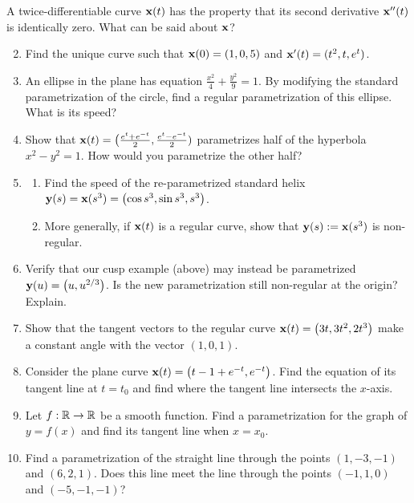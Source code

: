 \begin{exercises}
	\exstart A twice-differentiable curve ${\mathbf{x}}(t)$ has the property that its second derivative ${\mathbf{x}}''(t)$ is identically zero. What can be said about ${\mathbf{x}}$?
	\begin{enumerate}\setcounter{enumi}{1}  
		\item Find the unique curve such that ${\mathbf{x}}(0)=(1,0,5)$ and ${\mathbf{x}}'(t)=(t^2,t,e^t)$.
		
		\item An ellipse in the plane has equation $\frac{x^2}4+\frac{y^2}9=1$. By modifying the standard parametrization of the circle, find a regular parametrization of this ellipse. What is its speed?
		
		\item Show that ${\mathbf{x}}(t)=\bigl(\frac{e^t+e^{-t}}2,\frac{e^{t}-e^{-t}}2)$ parametrizes half of the hyperbola $x^2-y^2=1$. How would you parametrize the other half?
		
	  \item\label{exs:regnonintrinsic}\begin{enumerate}
	    \item Find the speed of the re-parametrized standard helix ${\mathbf{y}}(s)={\mathbf{x}}(s^3)=\bigl(\cos s^3,\sin s^3,s^3\bigr)$.
	    \item More generally, if ${\mathbf{x}}(t)$ is a regular curve, show that ${\mathbf{y}}(s):={\mathbf{x}}(s^3)$ is non-regular. 
	  \end{enumerate}
	  
		\item Verify that our cusp example (above) may instead be parametrized ${\mathbf{y}}(u)=\bigl(u,u^{2/3}\bigr)$. Is the new parametrization still non-regular at the origin? Explain.
		
		\item Show that the tangent vectors to the regular curve ${\mathbf{x}}(t)=\bigl(3t,3t^2,2t^3\bigr)$ make a constant angle with the vector $(1,0,1)$.
		
		\item Consider the plane curve ${\mathbf{x}}(t)=\bigl(t-1+e^{-t}, e^{-t}\bigr)$. Find the equation of its tangent line at $t=t_0$ and find where the tangent line intersects the $x$-axis.
	
		\item\label{exs:graphparam} Let $f:\mathbb{R}\to\mathbb{R}$ be a smooth function. Find a parametrization for the graph of $y=f(x)$ and find its tangent line when $x=x_0$.
	
		\item Find a parametrization of the straight line through the points $(1,-3,-1)$ and $(6,2,1)$. Does this line meet the line through the points $(-1,1,0)$ and $(-5,-1,-1)$?
	\end{enumerate}
\end{exercises}

